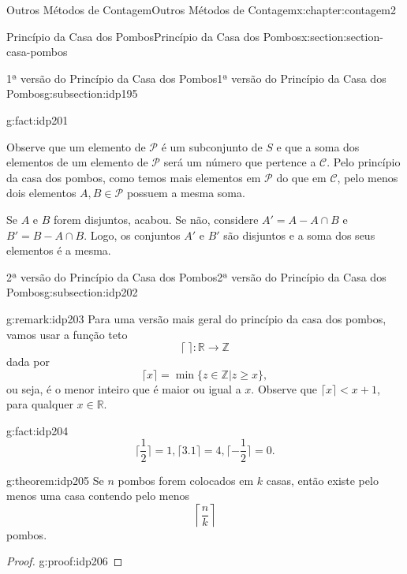 \documentclass[oneside,10pt,]{book}
\numberwithin{equation}{section}
\newcommand{\lt}{<}
\begin{document}
\begin{chapterptx}{Outros Métodos de Contagem}{}{Outros Métodos de Contagem}{}{}{x:chapter:contagem2}
\begin{sectionptx}{Princípio da Casa dos Pombos}{}{Princípio da Casa dos Pombos}{}{}{x:section:section-casa-pombos}
\begin{subsectionptx}{1ª versão do Princípio da Casa dos Pombos}{}{1ª versão do Princípio da Casa dos Pombos}{}{}{g:subsection:idp195}
\begin{fact}{}{}{g:fact:idp201}
\par
Observe que um elemento de \(\mathcal{P}\) é um subconjunto de \(S\) e que a soma dos elementos de um elemento de \(\mathcal{P}\) será um número que pertence a \(\mathcal{C}\). Pelo princípio da casa dos pombos, como temos mais elementos em \(\mathcal{P}\) do que em \(\mathcal{C}\), pelo menos dois elementos \(A, B \in \mathcal{P}\) possuem a mesma soma.%
\par
Se \(A\) e \(B\) forem disjuntos, acabou. Se não, considere \(A' = A- A\cap B\) e \(B' = B - A \cap B\). Logo, os conjuntos \(A'\) e \(B'\) são disjuntos e a soma dos seus elementos é a mesma.%
\end{fact}
\end{subsectionptx}
%
%
\typeout{************************************************}
\typeout{************************************************}
%
\begin{subsectionptx}{2ª versão do Princípio da Casa dos Pombos}{}{2ª versão do Princípio da Casa dos Pombos}{}{}{g:subsection:idp202}
\begin{remark}{}{g:remark:idp203}%
Para uma versão mais geral do princípio da casa dos pombos, vamos usar a função teto%
\begin{equation*}
\lceil ~ \rceil: \mathbb{R}\rightarrow \mathbb{Z}
\end{equation*}
dada por%
\begin{equation*}
\lceil x\rceil = \min\{ z\in \mathbb{Z} | z\geq x \},
\end{equation*}
ou seja, é o menor inteiro que é maior ou igual a \(x\). Observe que \(\lceil x \rceil \lt x +1 \), para qualquer \(x \in \mathbb{R}\).%
\end{remark}
\begin{fact}{}{}{g:fact:idp204}%
%
\begin{equation*}
\lceil \frac{1}{2} \rceil = 1, \lceil 3.1 \rceil = 4, \lceil -\frac{1}{2} \rceil=0.
\end{equation*}
%
\end{fact}
\begin{theorem}{}{}{g:theorem:idp205}%
Se \(n\) pombos forem colocados em \(k\) casas, então existe pelo menos uma casa contendo pelo menos%
\begin{equation*}
\left\lceil \frac{n}{k} \right\rceil 
\end{equation*}
pombos.%
\end{theorem}
\begin{proof}{}{g:proof:idp206}

\end{proof}
\end{subsectionptx}
\end{sectionptx}
\end{chapterptx}
\end{document}
